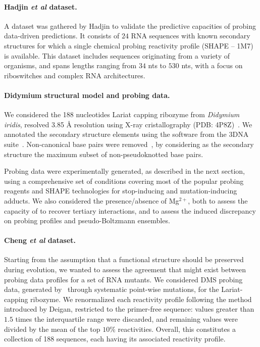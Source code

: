 \documentclass[a4,center,fleqn]{NAR}
\begin{document}
\paragraph{Hadjin \emph{et al} dataset.} 
A dataset was gathered by Hadjin\etal\cite{Hajdin2013} to validate the predictive capacities of probing data-driven predictions. It consists of $24$ RNA sequences with known secondary structures for which a single chemical probing reactivity profile (SHAPE -- 1M7) is available.
This dataset includes sequences originating from a variety of organisms, and spans lengths ranging from $34$ nts to $530$ nts, with a focus on riboswitches and complex RNA architectures. 

\paragraph{Didymium structural model and probing data.} 
We considered the 188 nucleotides Lariat capping ribozyme from {\itshape Didymium iridis}, resolved 3.85 \AA{} resolution using X-ray cristallography (PDB: 4P8Z)~\citep{Meyer2014}.  We annotated the secondary structure elements using the  software from the 3DNA suite~\cite{Lu2015}. Non-canonical base pairs were removed~\citep{Smit2008}, by considering as the secondary structure the maximum subset of non-pseudoknotted base pairs.

Probing data were experimentally generated, as described in the next section, using a comprehensive set of conditions covering most of the popular probing reagents and SHAPE technologies for stop-inducing and mutation-inducing adducts. We also considered the presence/absence of Mg$^{2+}$, both to assess the capacity of \OurTool{} to recover tertiary interactions, and to assess the induced discrepancy on probing profiles and pseudo-Boltzmann ensembles.


\paragraph{Cheng  \emph{et al} dataset.} 
Starting from the assumption that a functional structure should be preserved during evolution, we wanted to assess the agreement that might exist between probing data profiles for a set of RNA mutants. 
We considered DMS probing data, generated by~\cite{Cheng2017} through systematic point-wise mutations, for the Lariat-capping ribozyme. We renormalized each reactivity profile following the method introduced by Deigan\etal\cite{Deigan2009}, restricted to the primer-free sequence: values greater than $1.5 $ times the interquartile range were discarded, and remaining values were divided by the mean of the top $10\%$ reactivities.  Overall, this constitutes a collection of 188 sequences, each having its associated reactivity profile.
\end{document}
